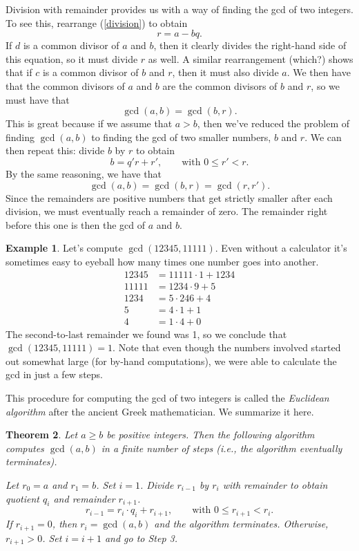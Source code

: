 \documentclass[12pt]{article}
\theoremstyle{plain}
\newtheorem{theorem}{Theorem}[section]
\theoremstyle{definition}
\newtheorem{example}[theorem]{Example}
\theoremstyle{remark}
\begin{document}
Division with remainder provides us with a way of finding the gcd of two integers.
To see this, rearrange (\ref{division}) to obtain
\[
    r = a - bq.
\]
If $d$ is a common divisor of $a$ and $b$, then it clearly divides the right-hand side of this equation, so it must divide $r$ as well.
A similar rearrangement (which?) shows that if $c$ is a common divisor of $b$ and $r$, then it must also divide $a$.
We then have that the common divisors of $a$ and $b$ are the common divisors of $b$ and $r$, so we must have that
\[
    \gcd(a,b) = \gcd(b,r).
\]
This is great because if we assume that $a > b$, then we've reduced the problem of finding $\gcd(a,b)$ to finding the gcd of two smaller numbers, $b$ and $r$.
We can then repeat this: divide $b$ by $r$ to obtain
\[
    b = q'r + r',\qquad \text{with }0\leq r' < r.
\]
By the same reasoning, we have that
\[
    \gcd(a,b) = \gcd(b,r) = \gcd(r,r').
\]
Since the remainders are positive numbers that get strictly smaller after each division, we must eventually reach a remainder of zero. The remainder right before this one is then the gcd of $a$ and $b$.
\begin{example}\label{gcd ex}
    Let's compute $\gcd(12345, 11111)$.
    Even without a calculator it's sometimes easy to eyeball how many times one number goes into another.
    \begin{align*}
        12345 &= 11111\cdot 1 + 1234\\
        11111 &= 1234\cdot 9 + 5\\
        1234 &= 5\cdot 246 + 4\\
        5 &= 4\cdot 1 + 1\\
        4 &= 1\cdot 4 + 0
    \end{align*}
    The second-to-last remainder we found was 1, so we conclude that $\gcd(12345, 11111) = 1$.
    Note that even though the numbers involved started out somewhat large (for by-hand computations), we were able to calculate the gcd in just a few steps.
\end{example}

This procedure for computing the gcd of two integers is called the \emph{Euclidean algorithm} after the ancient Greek mathematician.
We summarize it here.
\begin{theorem}
    Let $a\geq b$ be positive integers.
    Then the following algorithm computes $\gcd(a,b)$ in a finite number of steps (i.e., the algorithm eventually terminates).

    \begin{algorithmic}[1]
        \State Let $r_0 = a$ and $r_1 = b$.
        \State Set $i = 1$. 
        \State Divide $r_{i-1}$ by $r_i$ with remainder to obtain quotient $q_i$ and remainder $r_{i+1}$.
        \[
            r_{i-1} = r_i\cdot q_i + r_{i+1},\qquad \text{with }0\leq r_{i+1}<r_i.
        \]
        \State If $r_{i+1} = 0$, then $r_i = \gcd(a,b)$ and the algorithm terminates.
        \State Otherwise, $r_{i+1} > 0$. Set $i = i+1$ and go to Step 3.
    \end{algorithmic}

\end{theorem}
\end{document}
